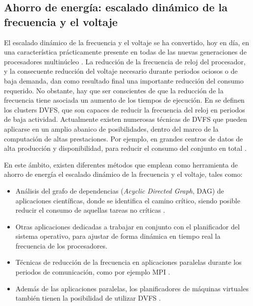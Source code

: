 \subsection{Ahorro de energía: escalado dinámico de la frecuencia y el voltaje}

El escalado dinámico de la frecuencia y el voltaje se ha convertido, hoy en día,
en una característica prácticamente presente en todas de las nuevas generaciones de 
procesadores multinúcleo \cite{hsu2005feasibility,hsu2005power}. La reducción de la frecuencia de reloj
del procesador, y la consecuente reducción del voltaje necesario durante periodos
ociosos o de baja demanda, dan como resultado final una importante reducción del
consumo requerido. No obstante, hay que ser conscientes de que la reducción
de la frecuencia tiene asociada un aumento de los tiempos de ejecución.
En \cite{LaszewskiWYH09} se definen los clusters DVFS, que son capaces de reducir la
frecuencia del reloj en periodos de baja actividad. Actualmente existen numerosas
técnicas de DVFS que pueden aplicarse en un amplio abanico de posibilidades,
dentro del marco de la computación de altas prestaciones. Por ejemplo, en 
grandes centros de datos de alta producción y disponibilidad, para reducir el 
consumo del conjunto en total \cite{DBLP:journals/computer/GortonGSW08,feng2007green}. 

En este ámbito, existen diferentes métodos que emplean como herramienta de ahorro 
de energía el escalado dinámico de la frecuencia y el voltaje, tales como:

\begin{itemize}
 \item Análisis del grafo de dependencias (\emph{Acyclic Directed Graph}, DAG) de 
aplicaciones científicas, donde se identifica el camino crítico, siendo posible
reducir el consumo de aquellas tareas no críticas \cite{Chen:2005:RPP:1053738.1054680}.

 \item Otras aplicaciones \cite{ge2007cpu} dedicadas a trabajar en conjunto con el planificador
del sistema operativo, para ajustar de forma dinámica en tiempo real la frecuencia
de los procesadores.

 \item Técnicas de reducción de la frecuencia en aplicaciones paralelas durante
los periodos de comunicación, como por ejemplo MPI \cite{freeh2005using,roundtree2007adaptive}.

 \item Además de las aplicaciones paralelas, los planificadores de máquinas
virtuales también tienen la posibilidad de utilizar DVFS \cite{LaszewskiWYH09}.
\end{itemize}

